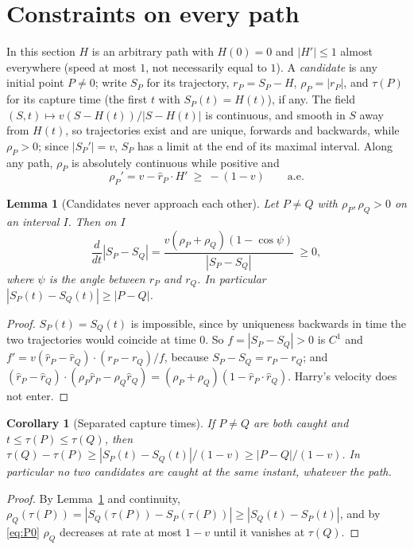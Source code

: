 \documentclass[11pt]{article}
\newtheorem{lemma}{Lemma}
\newtheorem{corollary}{Corollary}
\theoremstyle{remark}\newtheorem{remark}{Remark}
\newcommand{\rhat}{\hat r}
\begin{document}
\section{Constraints on every path}\label{sec:constraints}
In this section $H$ is an arbitrary path with $H(0)=0$ and $|H'|\le1$ almost everywhere (speed at most $1$, not necessarily
equal to $1$). A \emph{candidate} is any initial point $P\neq0$; write $S_P$ for its trajectory, $r_P=S_P-H$, $\rho_P=|r_P|$, and
$\tau(P)$ for its capture time (the first $t$ with $S_P(t)=H(t)$), if any. The field $(S,t)\mapsto v(S-H(t))/|S-H(t)|$ is continuous,
and smooth in $S$ away from $H(t)$, so trajectories exist and are unique, forwards and backwards, while $\rho_P>0$; since $|S_P'|=v$,
$S_P$ has a limit at the end of its maximal interval. Along any path, $\rho_P$ is absolutely continuous while positive and
\begin{equation}\label{eq:P0}
\rho_P'=v-\rhat_P\cdot H'\ \ge\ -(1-v)\qquad\text{a.e.}
\end{equation}

\begin{lemma}[Candidates never approach each other]\label{lem:E1}
Let $P\neq Q$ with $\rho_P,\rho_Q>0$ on an interval $I$. Then on $I$
\[
\frac{d}{dt}|S_P-S_Q|=\frac{v(\rho_P+\rho_Q)(1-\cos\psi)}{|S_P-S_Q|}\ \ge 0,
\]
where $\psi$ is the angle between $r_P$ and $r_Q$. In particular $|S_P(t)-S_Q(t)|\ge|P-Q|$.
\end{lemma}
\begin{proof}
$S_P(t)=S_Q(t)$ is impossible, since by uniqueness backwards in time the two trajectories would coincide at time $0$. So
$f=|S_P-S_Q|>0$ is $C^1$ and $f'=v(\rhat_P-\rhat_Q)\cdot(r_P-r_Q)/f$, because $S_P-S_Q=r_P-r_Q$; and
$(\rhat_P-\rhat_Q)\cdot(\rho_P\rhat_P-\rho_Q\rhat_Q)=(\rho_P+\rho_Q)(1-\rhat_P\cdot\rhat_Q)$. Harry's velocity does not enter.
\end{proof}

\begin{corollary}[Separated capture times]\label{cor:E2}
If $P\ne Q$ are both caught and $t\le\tau(P)\le\tau(Q)$, then $\tau(Q)-\tau(P)\ge|S_P(t)-S_Q(t)|/(1-v)\ge|P-Q|/(1-v)$.
In particular no two candidates are caught at the same instant, whatever the path.
\end{corollary}
\begin{proof}
By Lemma~\ref{lem:E1} and continuity, $\rho_Q(\tau(P))=|S_Q(\tau(P))-S_P(\tau(P))|\ge|S_Q(t)-S_P(t)|$, and by \eqref{eq:P0} $\rho_Q$
decreases at rate at most $1-v$ until it vanishes at $\tau(Q)$.
\end{proof}
\end{document}
